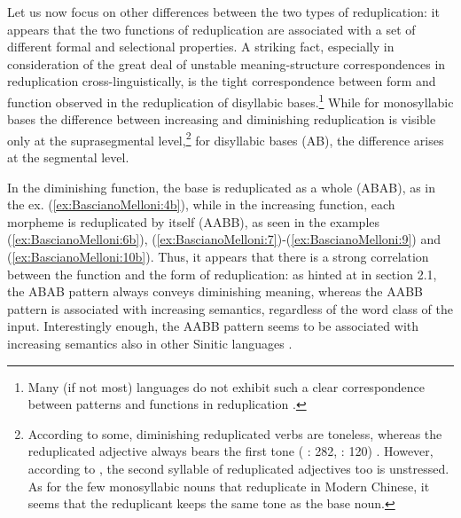 \documentclass[output=paper]{langsci/langscibook}
\begin{document}
Let us now focus on other differences between the two types of
reduplication: it appears that the two functions of reduplication are
associated with a set of different formal and selectional properties. A
striking fact, especially in consideration of the great deal of unstable
meaning-structure correspondences in reduplication cross-linguistically,
is the tight correspondence between form and function observed in the
reduplication of disyllabic bases.\footnote{Many (if not most) languages
  do not exhibit such a clear correspondence between patterns and
  functions in reduplication %
\citep{Mattes2014}%
%
.} While for monosyllabic
bases the difference between increasing and diminishing reduplication is
visible only at the suprasegmental level,\footnote{According to some,
  diminishing reduplicated verbs are toneless, whereas the reduplicated
  adjective always bears the first tone %
(%
\citealt{Tang88}%
%
: 282, 
\citealt{Paul2010a}%
%
: 120)%
%
. However, according to %
\citet[33]{Li1981}%
%
, the second
  syllable of reduplicated adjectives too is unstressed. As for the few
  monosyllabic nouns that reduplicate in Modern Chinese, it seems that
  the reduplicant keeps the same tone as the base noun.} for disyllabic
bases (AB), the difference arises at the segmental level.

In the diminishing function, the base is reduplicated as a whole (ABAB),
as in the ex. (\ref{ex:BascianoMelloni:4b}), while in the increasing function, each morpheme is
reduplicated by itself (AABB), as seen in the examples (\ref{ex:BascianoMelloni:6b}), (\ref{ex:BascianoMelloni:7})-(\ref{ex:BascianoMelloni:9}) and
(\ref{ex:BascianoMelloni:10b}). Thus, it appears that there is a strong correlation between the
function and the form of reduplication: as hinted at in section 2.1, the
ABAB pattern always conveys diminishing meaning, whereas the AABB
pattern is associated with increasing semantics, regardless of the word
class of the input. Interestingly enough, the AABB pattern seems to be
associated with increasing semantics also in other Sinitic languages
%
\citep[see][]{ArcodiaBascianoEtAl2015}%
%
.
\end{document}
